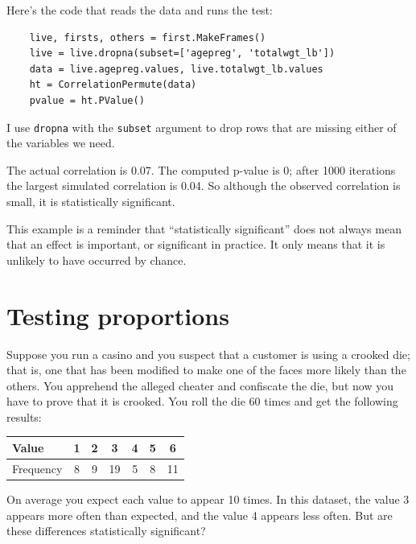 \documentclass[12pt]{book}
\theoremstyle{exercise}
\begin{document}
Here's the code that reads the data and runs the test:

\begin{verbatim}
    live, firsts, others = first.MakeFrames()
    live = live.dropna(subset=['agepreg', 'totalwgt_lb'])
    data = live.agepreg.values, live.totalwgt_lb.values
    ht = CorrelationPermute(data)
    pvalue = ht.PValue()
\end{verbatim}

I use {\tt dropna} with the {\tt subset} argument to drop rows
that are missing either of the variables we need.%
%
%

The actual correlation is 0.07.  The computed p-value is 0; after 1000
iterations the largest simulated correlation is 0.04.  So although the
observed correlation is small, it is statistically significant.%
%
%

This example is a reminder that ``statistically significant'' does not
always mean that an effect is important, or significant in practice.
It only means that it is unlikely to have occurred by chance.


\section{Testing proportions}%
\label{casino}%

Suppose you run a casino and you suspect that a customer is
using a crooked die; that
is, one that has been modified to make one of the faces more
likely than the others.  You apprehend the alleged
cheater and confiscate the die, but now you have to prove that it
is crooked.  You roll the die 60 times and get the following results:%
%
%

\begin{center}
\begin{tabular}{|l|c|c|c|c|c|c|}
\hline
Value     &  1  &  2  &  3  &  4  &  5  &  6  \\ 
\hline
Frequency &  8  &  9  &  19  &  5  &  8  &  11  \\
\hline
\end{tabular}
\end{center}

On average you expect each value to appear 10 times.  In this
dataset, the value 3 appears more often than expected, and the value 4
appears less often.  But are these differences statistically
significant?%
%
%
\end{document}
